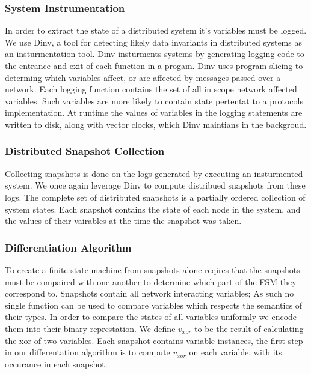 \subsubsection{System Instrumentation}

In order to extract the state of a distributed system it's variables must be
logged. We use Dinv, a tool for detecting likely data invariants in distributed
systems as an insturmentation tool. Dinv insturments systems by generating
logging code to the entrance and exit of each function in a progam. Dinv uses
program slicing to determing which variables affect, or are affected by
messages passed over a network. Each logging function contains the set of all
in scope network affected variables. Such variables are more likely to contain
state pertentat to a protocols implementation. At runtime the values of
variables in the logging statements are written to disk, along with vector
clocks, which Dinv maintians in the backgroud.

\subsubsection{Distributed Snapshot Collection}

Collecting snapshots is done on the logs generated by executing an insturmented
system. We once again leverage Dinv to compute distribued snapshots from these
logs. The complete set of distributed snapshots is a partially ordered
collection of system states. Each snapshot contains the state of each node in
the system, and the values of their vairables at the time the snapshot was
taken.

\subsubsection{Differentiation Algorithm}

To create a finite state machine from snapshots alone reqires that the
snapshots must be compaired with one another to determine which part of the FSM
they correspond to. Snapshots contain all network interacting variables; As
such no single function can be used to compare variables which respects the
semantics of their types. In order to compare the states of all variables
uniformly we encode them into their binary represtation. We define $v_{xor}$ to
be the result of calculating the xor of two variables. Each snapshot contains
variable instances, the first step in our differentation algorithm is to
compute $v_{xor}$ on each variable, with its occurance in each snapshot.


